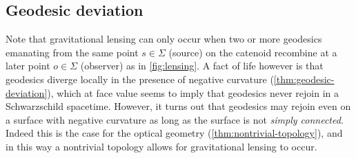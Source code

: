 \subsection{Geodesic deviation}
Note that gravitational lensing can only occur when two or more geodesics emanating from the same point $s \in \Sigma$ (source) on the catenoid recombine at a later point $o \in \Sigma$ (observer) as in \cref{fig:lensing}.
A fact of life however is that geodesics diverge locally in the presence of negative curvature (\cref{thm:geodesic-deviation}), which at face value seems to imply that geodesics never rejoin in a Schwarzschild spacetime.
However, it turns out that geodesics may rejoin even on a surface with negative curvature as long as the surface is not \textit{simply connected}.
Indeed this is the case for the optical geometry (\cref{thm:nontrivial-topology}), and in this way a nontrivial topology allows for gravitational lensing to occur.


